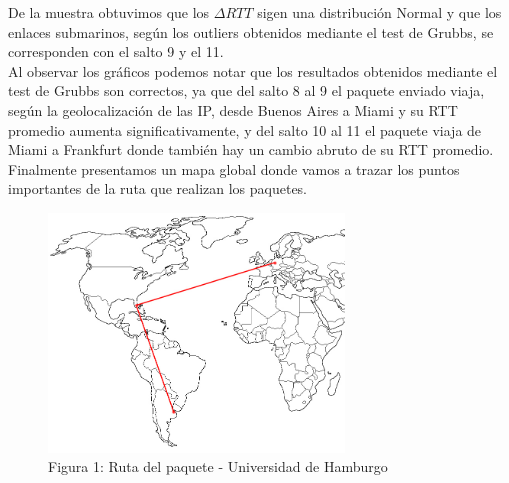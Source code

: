 De la muestra obtuvimos que los $\Delta RTT$ sigen una distribuci\'on Normal y que los enlaces submarinos, según los outliers obtenidos mediante el test de Grubbs, se corresponden con el salto 9 y el 11.
\\
Al observar los gráficos podemos notar que los resultados obtenidos mediante el test de Grubbs son correctos, ya que del salto 8 al 9 el paquete enviado viaja, según la geolocalización de las IP, desde Buenos Aires a Miami y su RTT promedio aumenta significativamente, y del salto 10 al 11 el paquete viaja de Miami a Frankfurt donde también hay un cambio abruto de su RTT promedio.
\\
Finalmente presentamos un mapa global donde vamos a trazar los puntos importantes de la ruta que realizan los paquetes. 
\newpage
\begin{figure}[h]
	\begin{center}
    \includegraphics[width=0.7\textwidth]{img_analisis3/mapa.jpg} 
    \caption{Figura 1: Ruta del paquete - Universidad de Hamburgo}	
	\end{center} 
\end{figure}

